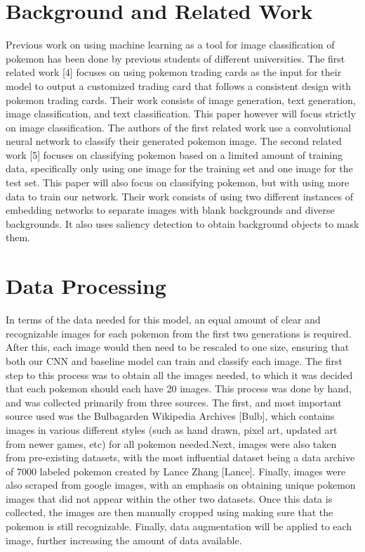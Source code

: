 \documentclass{article} %
\begin{document}
\section{Background and Related Work}

Previous work on using machine learning as a tool for image classification of pokemon has been done by previous students of different universities. The first related work [4] focuses on using pokemon trading cards as the input for their model to output a customized trading card that follows a consistent design with pokemon trading cards. Their work consists of image generation, text generation, image classification, and text classification. 
This paper however will focus strictly on image classification. The authors of the first related work use a convolutional neural network to classify their generated pokemon image. The second related work [5] focuses on classifying pokemon based on a limited amount of training data, specifically only using one image for the training set and one image for the test set. This paper will also focus on classifying pokemon, but with using more data to train our network. Their work consists of using two different instances of embedding networks to separate images with blank backgrounds and diverse backgrounds. It also uses saliency detection to obtain background objects to mask them. 

\section{Data Processing}

In terms of the data needed for this model, an equal amount of clear and recognizable images for each pokemon from the first two generations is required. After this, each image would then need to be rescaled to one size, ensuring that both our CNN and baseline model can train and classify each image. The first step to this process was to obtain all the images needed, to which it was decided that each pokemon should each have 20 images. This process was done by hand, and was collected primarily from three sources. The first, and most important source used was the Bulbagarden Wikipedia Archives [Bulb], which contains images in various different styles (such as hand drawn, pixel art, updated art from newer games, etc) for all pokemon needed.Next, images were also taken from pre-existing datasets, with the most influential dataset being a data archive of 7000 labeled pokemon created by Lance Zhang [Lance]. Finally, images were also scraped from google images, with an emphasis on obtaining unique pokemon images that did not appear within the other two datasets. Once this data is collected, the images are then manually cropped using making sure that the pokemon is still recognizable. Finally, data augmentation will be applied to each image, further increasing the amount of data available. 
\end{document}
